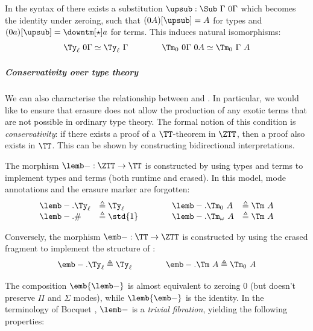 \begin{theorem}\label{thm:need-nothing}
  In the syntax of \ZTT there
  exists a substitution $\upsub : \Sub\ \Gamma\ 0\Gamma$ which becomes the identity
  under zeroing, such that $(0A)[\upsub] = A$ for types and $(0a)[\upsub] = \downtm[\star] a$ for terms.
  This induces natural isomorphisms:
  \[\begin{array}{l}
    \Ty_\ell\ 0\Gamma \simeq \Ty_\ell\ \Gamma \qquad\qquad
    \Tm_0\ 0\Gamma\ 0 A \simeq \Tm_0\ \Gamma\ A
  \end{array}\]
\end{theorem}

\subparagraph{Conservativity over type theory}
We can also characterise the relationship between \ZTT and \TT. In particular,
we would like to ensure that erasure does not allow the production of any exotic
terms that are not possible in ordinary type theory. The formal notion of this
condition is \emph{conservativity}: if there exists a proof of a $\TT$-theorem
in $\ZTT$, then a proof also exists in $\TT$. This can be shown by constructing
bidirectional interpretations.

\begin{definition}\label{def:tt-model}
  The morphism $\lemb - :
  \ZTT \to \TT$ is constructed by using \TT types and terms to implement \ZTT
  types and terms (both runtime and erased). In this model, mode annotations and
  the erasure marker are forgotten:
  \[\begin{array}{ll@{\qquad\qquad}ll}
  \lemb-.\Ty_\ell      &\triangleq \Ty_\ell  &
  \lemb-.\Tm_0\ A      &\triangleq \Tm\ A  \\
  \lemb-.\#            &\triangleq \std{1}  &
  \lemb-.\Tm_\omega\ A &\triangleq \Tm\ A
  \end{array}\]
\end{definition}


\begin{definition}\label{def:0tt-model}
  Conversely, the morphism $\emb - : \TT \to \ZTT$ is constructed
  by using the erased fragment to implement the structure of \TT:
  \[
  \emb-.\Ty_\ell \triangleq  \Ty_\ell \qquad\qquad
  \emb-.\Tm\ A \triangleq  \Tm_0\ A
  \]
\end{definition}

The composition $\emb{\lemb-}$ is almost equivalent to zeroing $0$ (but doesn't
preserve $\Pi$ and $\Sigma$ modes), while $\lemb{\emb-}$ is the identity. In the
terminology of Bocquet \cite[p.~40]{Bocquet2025-ox}, $\lemb -$ is a \emph{trivial
fibration}, yielding the following properties:

